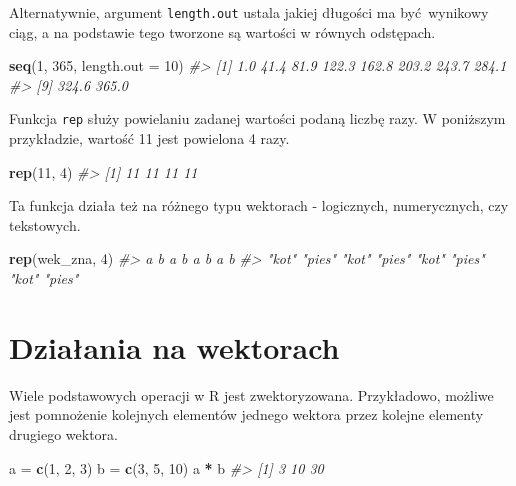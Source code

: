 \documentclass[paper=6in:9in,pagesize=pdftex,headinclude=on,footinclude=on,10pt]{scrbook}
\newenvironment{Shaded}{\begin{snugshade}}{\end{snugshade}}
\newcommand{\CommentTok}[1]{\textcolor[rgb]{0.56,0.35,0.01}{\textit{#1}}}
\newcommand{\DataTypeTok}[1]{\textcolor[rgb]{0.13,0.29,0.53}{#1}}
\newcommand{\DecValTok}[1]{\textcolor[rgb]{0.00,0.00,0.81}{#1}}
\newcommand{\KeywordTok}[1]{\textcolor[rgb]{0.13,0.29,0.53}{\textbf{#1}}}
\newcommand{\NormalTok}[1]{#1}
\newcommand{\OperatorTok}[1]{\textcolor[rgb]{0.81,0.36,0.00}{\textbf{#1}}}
\newcommand{\StringTok}[1]{\textcolor[rgb]{0.31,0.60,0.02}{#1}}
\begin{document}
Alternatywnie, argument \texttt{length.out} ustala jakiej długości ma być~wynikowy ciąg, a na podstawie tego tworzone są wartości w równych odstępach.

\begin{Shaded}
\begin{Highlighting}[]
\KeywordTok{seq}\NormalTok{(}\DecValTok{1}\NormalTok{, }\DecValTok{365}\NormalTok{, }\DataTypeTok{length.out =} \DecValTok{10}\NormalTok{)}
\CommentTok{#>  [1]   1.0  41.4  81.9 122.3 162.8 203.2 243.7 284.1}
\CommentTok{#>  [9] 324.6 365.0}
\end{Highlighting}
\end{Shaded}

Funkcja \texttt{rep} służy powielaniu zadanej wartości podaną liczbę razy.
W poniższym przykładzie, wartość 11 jest powielona 4 razy.

\begin{Shaded}
\begin{Highlighting}[]
\KeywordTok{rep}\NormalTok{(}\DecValTok{11}\NormalTok{, }\DecValTok{4}\NormalTok{)}
\CommentTok{#> [1] 11 11 11 11}
\end{Highlighting}
\end{Shaded}

Ta funkcja działa też na różnego typu wektorach - logicznych, numerycznych, czy tekstowych.

\begin{Shaded}
\begin{Highlighting}[]
\KeywordTok{rep}\NormalTok{(wek_zna, }\DecValTok{4}\NormalTok{)}
\CommentTok{#>      a      b      a      b      a      b      a      b }
\CommentTok{#>  "kot" "pies"  "kot" "pies"  "kot" "pies"  "kot" "pies"}
\end{Highlighting}
\end{Shaded}

\hypertarget{dzialania-na-wektorach}{%
\section{Działania na wektorach}\label{dzialania-na-wektorach}}

Wiele podstawowych operacji w R jest zwektoryzowana.
Przykładowo, możliwe jest pomnożenie kolejnych elementów jednego wektora przez kolejne elementy drugiego wektora.

\begin{Shaded}
\begin{Highlighting}[]
\NormalTok{a =}\StringTok{ }\KeywordTok{c}\NormalTok{(}\DecValTok{1}\NormalTok{, }\DecValTok{2}\NormalTok{, }\DecValTok{3}\NormalTok{)}
\NormalTok{b =}\StringTok{ }\KeywordTok{c}\NormalTok{(}\DecValTok{3}\NormalTok{, }\DecValTok{5}\NormalTok{, }\DecValTok{10}\NormalTok{)}
\NormalTok{a }\OperatorTok{*}\StringTok{ }\NormalTok{b}
\CommentTok{#> [1]  3 10 30}
\end{Highlighting}
\end{Shaded}
\end{document}
